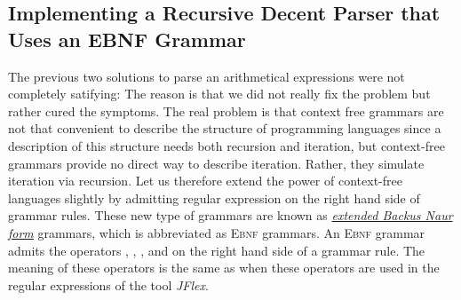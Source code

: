 
\subsection{Implementing a Recursive Decent Parser that Uses an \textsc{EBNF} Grammar}
The previous two solutions to parse an arithmetical expressions were not completely
satifying:  The reason is that we did not really fix the problem but rather cured the
symptoms.  The real problem is that context free grammars are not that convenient to
describe the structure of programming languages since a description of this structure needs both
recursion and iteration, but context-free grammars provide no direct way to describe iteration.
Rather, they simulate iteration via recursion.  Let us therefore extend the power of context-free
languages 
slightly by admitting regular expression on the right hand side of grammar rules.  
These new type of grammars are known as
\href{http://en.wikipedia.org/wiki/Extended_Backus_Naur_Form}{\emph{extended Backus Naur form}}
grammars, which 
is abbreviated as \textsc{Ebnf} grammars.  An \textsc{Ebnf} grammar admits the operators
\squoted{*}, , \squoted{+}, and \squoted{|} on the right hand side of a grammar
rule.  The meaning of these operators is the same as when these operators are used in 
the regular expressions of the tool \textsl{JFlex}.

